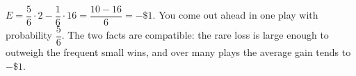$E=\dfrac56\cdot2-\dfrac16\cdot16=\dfrac{10-16}6=\boxed{-\$1}$. You come out ahead in one play with probability $\boxed{\dfrac56}$. The two facts are compatible: the rare loss is large enough to outweigh the frequent small wins, and over many plays the average gain tends to $-\$1$.
